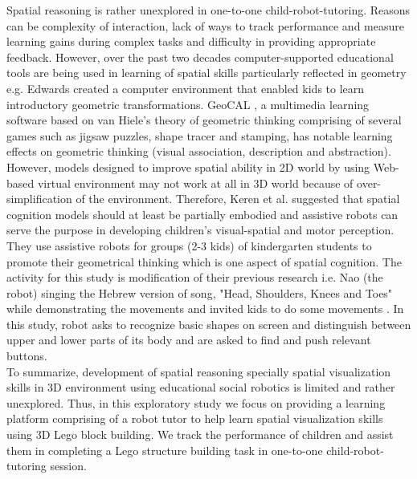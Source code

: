 Spatial reasoning is rather unexplored in one-to-one child-robot-tutoring. Reasons can be complexity of interaction, lack of ways to track performance and measure learning gains during complex tasks and difficulty in providing appropriate feedback. However, over the past two decades computer-supported educational tools are being used in learning of spatial skills particularly reflected in geometry e.g. Edwards created a computer environment that enabled kids to learn introductory geometric transformations\parencite{edwards1991children}. GeoCAL \parencite{chang2007developing}, a multimedia learning software based on van Hiele's theory of geometric thinking \parencite{chang2007developing} comprising of several games such as jigsaw puzzles, shape tracer and stamping, has notable learning effects on geometric thinking (visual association, description and abstraction). \\
However, models designed to improve spatial ability in 2D world by using Web-based virtual environment \parencite{rafi2005improving}  may not work at all in 3D world because of over-simplification of the environment. Therefore, Keren et al. 
\parencite{keren2012kindergarten} suggested that spatial cognition models should at least be partially embodied and assistive robots can serve the purpose in developing children's visual-spatial and motor perception. They use assistive robots for groups (2-3 kids) of kindergarten students to promote their geometrical thinking which is one aspect of spatial cognition. The activity for this study is modification of their previous research i.e. Nao (the robot) singing the Hebrew version of song, "Head, Shoulders, Knees and Toes" while demonstrating the movements and invited kids to do some movements \parencite{fridin2014robotics}. In this study, robot asks to recognize basic shapes on screen and distinguish between upper and lower parts of its body and are asked to find and push relevant buttons. \\
To summarize, development of spatial reasoning specially spatial visualization skills in 3D environment using educational social robotics is limited and rather unexplored. Thus, in this exploratory study we focus on providing a learning platform comprising of a robot tutor to help learn spatial visualization skills using 3D Lego\textsuperscript\textregistered{} block building. We track the performance of children and assist them in completing a Lego\textsuperscript\textregistered{} structure building task in one-to-one child-robot-tutoring session.     


